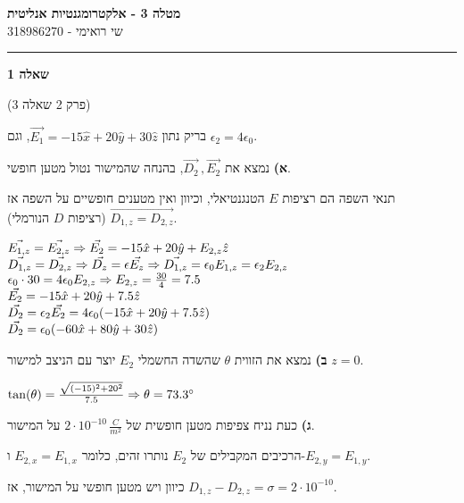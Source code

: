 \documentclass[14pt]{extarticle}
\makeatletter
\newenvironment{lefteqs}{%
    \begin{english}%
    \begin{flushleft}%
    \renewcommand{\arraystretch}{1.3}%
    $\begin{array}{@{}l@{}}%
}{%
    \end{array}$%
    \end{flushleft}%
    \end{english}%
}
\makeatother
\begin{document}
\begin{center}
    {\LARGE \textbf{מטלה 3 - אלקטרומגנטיות אנליטית}}\\[0.5em]
    {\large שי רואימי - 318986270}\\[0.3em]
\end{center}

\hrule
\vspace{2em}

\textbf{\large שאלה 1}

(פרק 2 שאלה 3)

בריק נתון $\vec{E_1}=-15\hat{x} + 20\hat{y}+30\hat{z}$, וגם $\epsilon_2=4\epsilon_0$.

\textbf{א)} 
נמצא את $\vec{D_2} \, , \vec{E_2}$, בהנחה שהמישור נטול מטען חופשי.

תנאי השפה הם רציפות $E$ הטנגנטיאלי, וכיוון ואין מטענים חופשיים על השפה אז $\vec{D_{1,z}=D_{2,z}}$ (רציפות $D$ הנורמלי).

\begin{lefteqs}
    \vec{E_{1,z}} = \vec{E_{2,z}} \Rightarrow \vec{E_2} = -15\hat{x} + 20\hat{y} + E_{2,z}\hat{z} \\
    \vec{D_{1,z}} = \vec{D_{2,z}} \Rightarrow \vec{D_z} = \epsilon \vec{E_z} \Rightarrow \vec{D_{1,z}} = \epsilon_0 E_{1,z} = \epsilon_2 E_{2,z} \\
    \epsilon_0 \cdot 30 = 4\epsilon_0 E_{2,z} \Rightarrow E_{2,z} = \frac{30}{4} = 7.5 \\
    \vec{E_2} = -15\hat{x} + 20\hat{y} + 7.5\hat{z} \\
    \vec{D_2} = \epsilon_2 \vec{E_2} = 4\epsilon_0(-15\hat{x} + 20\hat{y} + 7.5\hat{z}) \\
    \vec{D_2} = \epsilon_0(-60\hat{x} + 80\hat{y} + 30\hat{z})
\end{lefteqs}

\textbf{ב)} 
נמצא את הזווית $\theta$ שהשדה החשמלי $E_2$ יוצר עם הניצב למישור $z=0$.

\begin{lefteqs}
    \tan(\theta) = \frac{\sqrt{(-15)^2 + 20^2}}{7.5} \Rightarrow \theta = 73.3^\circ
\end{lefteqs}

\textbf{ג)} 
כעת נניח צפיפות מטען חופשית של $2 \cdot 10^{-10} \, \frac{C}{m^2}$ על המישור.

הרכיבים המקבילים של $E_2$ נותרו זהים, כלומר $E_{2,x} = E_{1,x}$ ו-$E_{2,y} = E_{1,y}$.

כיוון ויש מטען חופשי על המישור, אז $D_{1,z} - D_{2,z} = \sigma = 2 \cdot 10^{-10}$.
\end{document}
